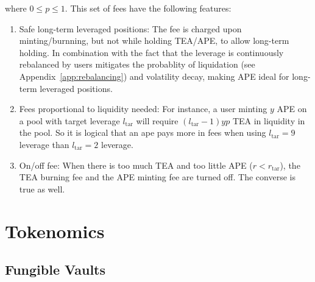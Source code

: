 \documentclass[journal,letterpaper,oneside,onecolumn,12pt]{IEEEtran}
\begin{document}
	where $0\leq p\leq 1$.
	This set of fees have the following features:
	\begin{enumerate}
		\item Safe long-term leveraged positions: The fee is charged upon minting/burnning, but not while holding TEA/APE, to allow long-term holding. In combination with the fact that the leverage is continuously rebalanced by users mitigates the probablity of liquidation (see Appendix~\ref{app:rebalancing}) and volatility decay, making APE ideal for long-term leveraged positions.
		\item Fees proportional to liquidity needed: For instance, a user minting $y$ APE on a pool with target leverage $l_\textrm{tar}$ will require $(l_\textrm{tar}-1)yp$ TEA in liquidity in the pool. So it is logical that an ape pays more in fees when using $l_\textrm{tar}=9$ leverage than $l_\textrm{tar}=2$ leverage.
		\item On/off fee: When there is too much TEA and too little APE ($r<r_\textrm{tar}$), the TEA burning fee and the APE minting fee are turned off. The converse is true as well.
	\end{enumerate}
	 
	
	

	
	
	
	\section{Tokenomics}
	
	
	
	\subsection{Fungible Vaults}
	
\end{document}
